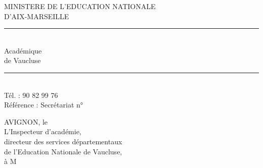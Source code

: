 {

}

\noindent\begin{minipage}[t]{.48\linewidth}\raggedright\small
MINISTERE DE L'EDUCATION NATIONALE\\
 D'AIX-MARSEILLE\\
\hspace{2em}\rule{2cm}{0.3pt}\\
 Académique\\
de Vaucluse\\
\hspace{2em}\rule{2cm}{0.3pt}\\
Tél. : 90 82 99 76\\
Référence : Secrétariat n°
\end{minipage}\hfill%
\begin{minipage}[t]{.48\linewidth}\raggedright\small
AVIGNON, le\\
L'Inspecteur d'académie,\\
directeur des services départementaux\\
de l'Education Nationale de Vaucluse,\\
à M
\end{minipage}

